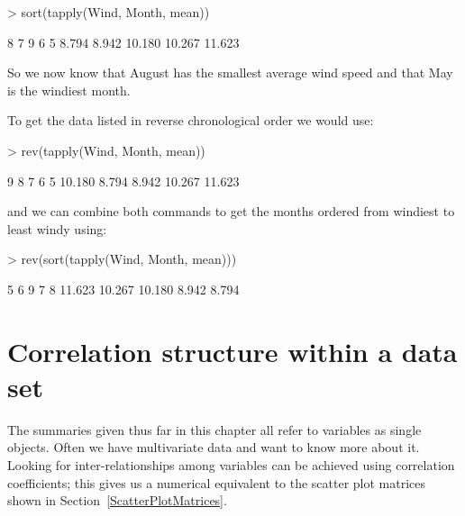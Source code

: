 \begin{Schunk}
\begin{Sinput}
> sort(tapply(Wind, Month, mean)) 
\end{Sinput}
\begin{Soutput}
     8      7      9      6      5 
 8.794  8.942 10.180 10.267 11.623 
\end{Soutput}
\end{Schunk}

So we now know that August has the smallest average wind speed and that May is the windiest month. 
 
To get the data listed in reverse chronological order we would use: 

\begin{Schunk}
\begin{Sinput}
> rev(tapply(Wind, Month, mean)) 
\end{Sinput}
\begin{Soutput}
     9      8      7      6      5 
10.180  8.794  8.942 10.267 11.623 
\end{Soutput}
\end{Schunk}

and we can combine both commands to get the months ordered from windiest to least windy using: 

\begin{Schunk}
\begin{Sinput}
> rev(sort(tapply(Wind, Month, mean))) 
\end{Sinput}
\begin{Soutput}
     5      6      9      7      8 
11.623 10.267 10.180  8.942  8.794 
\end{Soutput}
\end{Schunk}

 
\section{Correlation structure within a data set} 
\label{CorrelationStructure} 
 
The summaries given thus far in this chapter all refer to variables as single objects. Often we have multivariate data and want to know more about it. Looking for inter-relationships among variables can be achieved using correlation coefficients; this gives us a numerical equivalent to the scatter plot matrices shown in Section~\ref{ScatterPlotMatrices}. 
 

